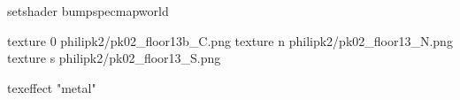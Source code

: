 setshader bumpspecmapworld

texture 0 philipk2/pk02_floor13b_C.png
texture n philipk2/pk02_floor13_N.png
texture s philipk2/pk02_floor13_S.png

texeffect "metal"

